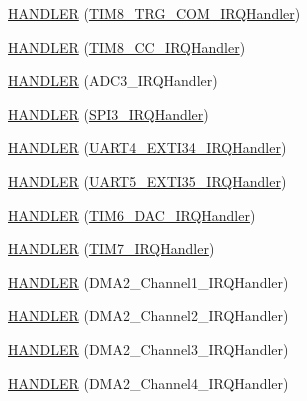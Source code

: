 \begin{DoxyCompactItemize}
\item 
\hyperlink{group___p_i_o_s_ga3df951db7fa4ae71db65090983cb1947}{\-H\-A\-N\-D\-L\-E\-R} (\hyperlink{group___p_i_o_s___t_i_m_ga5e1addc9f7d3e0ffa4ed6ca284123043}{\-T\-I\-M8\-\_\-\-T\-R\-G\-\_\-\-C\-O\-M\-\_\-\-I\-R\-Q\-Handler})
\item 
\hyperlink{group___p_i_o_s_ga015d5c07ddbb9c51c66a77065a08c22a}{\-H\-A\-N\-D\-L\-E\-R} (\hyperlink{group___p_i_o_s___t_i_m_ga96e44d6fe80524f038da6254514316a4}{\-T\-I\-M8\-\_\-\-C\-C\-\_\-\-I\-R\-Q\-Handler})
\item 
\hyperlink{group___p_i_o_s_ga446e8dca18881d21381741e57a0e2853}{\-H\-A\-N\-D\-L\-E\-R} (\-A\-D\-C3\-\_\-\-I\-R\-Q\-Handler)
\item 
\hyperlink{group___p_i_o_s_ga8adae9815b64a37af214413ac6c1843a}{\-H\-A\-N\-D\-L\-E\-R} (\hyperlink{group___flying_f3_ga82987561e28d02b184ecb0515a5e5d2b}{\-S\-P\-I3\-\_\-\-I\-R\-Q\-Handler})
\item 
\hyperlink{group___p_i_o_s_ga5015849ca8d806a1625b3584cb5c962d}{\-H\-A\-N\-D\-L\-E\-R} (\hyperlink{group___p_i_o_s___u_s_a_r_t_ga552c5d505ae108eef11cd39ebc22773b}{\-U\-A\-R\-T4\-\_\-\-E\-X\-T\-I34\-\_\-\-I\-R\-Q\-Handler})
\item 
\hyperlink{group___p_i_o_s_ga40bf19e8e0d8608164a79fc0c9697b9f}{\-H\-A\-N\-D\-L\-E\-R} (\hyperlink{group___p_i_o_s___u_s_a_r_t_ga379570b068a7a67525c68b24831f77fd}{\-U\-A\-R\-T5\-\_\-\-E\-X\-T\-I35\-\_\-\-I\-R\-Q\-Handler})
\item 
\hyperlink{group___p_i_o_s_ga7b3222d00864779c700492060cc4dda9}{\-H\-A\-N\-D\-L\-E\-R} (\hyperlink{group___p_i_o_s___t_i_m_ga0839a45f331c4c067939b9c4533bbf4d}{\-T\-I\-M6\-\_\-\-D\-A\-C\-\_\-\-I\-R\-Q\-Handler})
\item 
\hyperlink{group___p_i_o_s_ga147fa8f18128bdddf9ee07691a5b00a3}{\-H\-A\-N\-D\-L\-E\-R} (\hyperlink{group___p_i_o_s___t_i_m_ga98cff83252098363b2dbca9608df964e}{\-T\-I\-M7\-\_\-\-I\-R\-Q\-Handler})
\item 
\hyperlink{group___p_i_o_s_ga6717e88a5b952955f7cbdf18a2407b0c}{\-H\-A\-N\-D\-L\-E\-R} (\-D\-M\-A2\-\_\-\-Channel1\-\_\-\-I\-R\-Q\-Handler)
\item 
\hyperlink{group___p_i_o_s_gaf2086766394e4d1b904c8c606332ee87}{\-H\-A\-N\-D\-L\-E\-R} (\-D\-M\-A2\-\_\-\-Channel2\-\_\-\-I\-R\-Q\-Handler)
\item 
\hyperlink{group___p_i_o_s_ga95ff74d750f8a2647ab624f233ec4546}{\-H\-A\-N\-D\-L\-E\-R} (\-D\-M\-A2\-\_\-\-Channel3\-\_\-\-I\-R\-Q\-Handler)
\item 
\hyperlink{group___p_i_o_s_gab5d0cd2c1bbe6a1eeaa91bc6b2c14ad9}{\-H\-A\-N\-D\-L\-E\-R} (\-D\-M\-A2\-\_\-\-Channel4\-\_\-\-I\-R\-Q\-Handler)

\end{DoxyCompactItemize}
